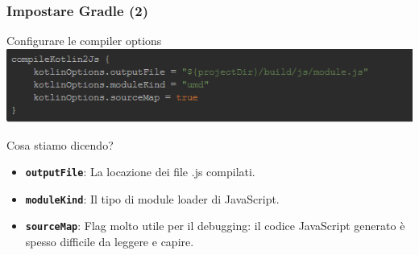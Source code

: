     \begin{frame}
      \frametitle{Impostare Gradle (2)}
      \begin{block}{Configurare le compiler options}
        \includegraphics[scale=0.67]{Kt2JsGradle}
      \end{block}
      \begin{block}{Cosa stiamo dicendo?}
        \begin{itemize}
          \item \textbf{\texttt{outputFile}}: La locazione dei file .js compilati.
          \item \textbf{\texttt{moduleKind}}: Il tipo di module loader di JavaScript.
          \item \textbf{\texttt{sourceMap}}: Flag molto utile per il debugging: il codice JavaScript generato è spesso difficile da leggere e capire.
        \end{itemize}
      \end{block}
    \end{frame}



